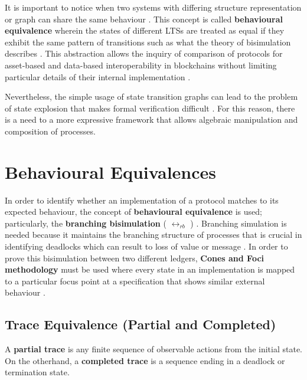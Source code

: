 It is important to notice when two systems with differing structure
representation or graph can share the same behaviour
\citep{baeten1995concrete}. This concept is called \textbf{behavioural
equivalence} wherein the states of different LTSs are treated as equal
if they exhibit the same pattern of transitions such as what the theory
of bisimulation describes \citep{baeten1995concrete}
\citep{Gorrieri_2017}. This abstraction allows the inquiry of comparison
of protocols for asset-based and data-based interoperability in
blockchains without limiting particular details of their internal
implementation \citep{plotkin2004structural}.

Nevertheless, the simple usage of state transition graphs can lead to
the problem of state explosion that makes formal verification difficult
\citep{vaandrager1986verification}. For this reason, there is a need to
a more expressive framework that allows algebraic manipulation and
composition of processes.

\section{Behavioural Equivalences}\label{behavioural-equivalences}

In order to identify whether an implementation of a protocol matches to
its expected behaviour, the concept of \textbf{behavioural equivalence}
is used; particularly, the \textbf{branching bisimulation} (
\(\leftrightarrow_{rb}\) ) \citep{Fokkink2004}
\citep{fokkink2007introduction}. Branching simulation is needed because
it maintains the branching structure of processes that is crucial in
identifying deadlocks which can result to loss of value or message
\citep{Fokkink2004}. In order to prove this bisimulation between two
different ledgers, \textbf{Cones and Foci methodology} must be used
where every state in an implementation is mapped to a particular focus
point at a specification that shows similar external behaviour
\citep{Fokkink2004}.

\subsection{Trace Equivalence (Partial and
Completed)}\label{trace-equivalence-partial-and-completed}

A \textbf{partial trace} is any finite sequence of observable actions
from the initial state. On the otherhand, a \textbf{completed trace} is
a sequence ending in a deadlock or termination state.


